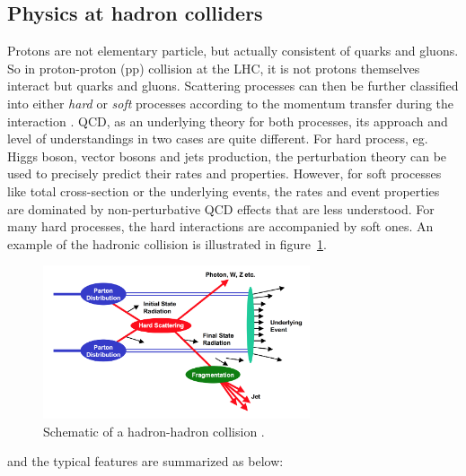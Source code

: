 \subsection{Physics at hadron colliders}
\label{hadroniccollision}

Protons are not elementary particle, but actually consistent of quarks and gluons.
So in proton-proton (pp) collision at the LHC, it is not protons themselves interact but quarks and gluons.
Scattering processes can then be further classified into either \textit{hard} or \textit{soft} processes
according to the momentum transfer during the interaction \cite{Dremin:2005wd}.
QCD, as an underlying theory for both processes, its approach and level of understandings in two cases are quite different.
For hard process, eg. Higgs boson, vector bosons and jets production, 
the perturbation theory can be used to precisely predict their rates and properties.
However, for soft processes like total cross-section or the underlying events, the rates and event properties are dominated by non-perturbative QCD effects that are less understood.
For many hard processes, the hard interactions are accompanied by soft ones.
An example of the hadronic collision is illustrated in figure~\ref{fig:C2_had_col}. 
\begin{figure}[!htb]
  \centering
  \includegraphics[width=0.7\textwidth]{figures/Theory/hh_collision.png}
  \caption{Schematic of a hadron-hadron collision \cite{Womersley:2000cx}.}
  \label{fig:C2_had_col}
\end{figure}
and the typical features are summarized as below:
